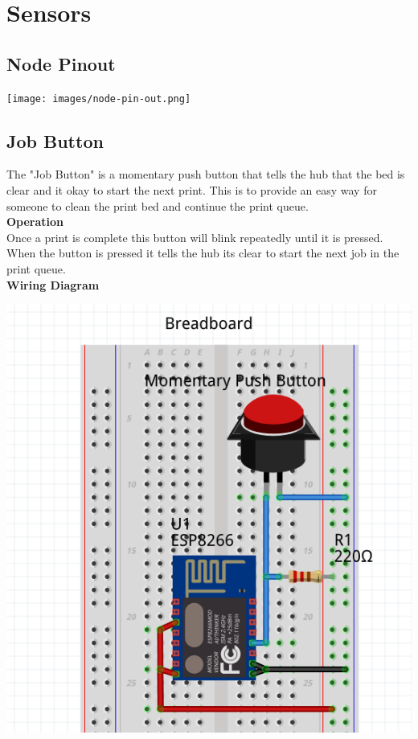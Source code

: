   \section{Sensors}
  \subsection{Node Pinout}
  \begin{center}
        \texttt{[image: images/node-pin-out.png]}
  \end{center}
    \subsection{Job Button}
      The "Job Button" is a momentary push button that tells the hub that the bed
      is clear and it okay to start the next print. This is to provide an easy way
      for someone to clean the print bed and continue the print queue.\\

      \textbf{Operation}\\
      Once a print is complete this button will blink repeatedly until it is pressed.
      When the button is pressed it tells the hub its clear to start the next job in the
      print queue.\\

      \textbf{Wiring Diagram}\\
            \begin{center}
      \includegraphics[scale=0.25]{images/job-cir.png}
      \end{center}
